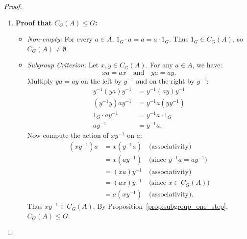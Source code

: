 \begin{proof}
\begin{enumerate}[label=\textbf{(\roman*)}, leftmargin=*, itemsep=8pt]
    \item \textbf{Proof that $C_G(A) \le G$:}
    \begin{itemize}[leftmargin=1.5em, itemsep=4pt]
        \item \emph{Non-empty:} For every $a \in A$, $1_G \cdot a = a = a \cdot 1_G$. Thus $1_G \in C_G(A)$, so $C_G(A) \ne \emptyset$.
        \item \emph{Subgroup Criterion:} Let $x, y \in C_G(A)$. For any $a \in A$, we have:
        \begin{equation*}
        xa = ax \quad \text{and} \quad ya = ay.
        \end{equation*}
        Multiply $ya = ay$ on the left by $y^{-1}$ and on the right by $y^{-1}$:
        \begin{align*}
        y^{-1}(ya)y^{-1} &= y^{-1}(ay)y^{-1} \\
        (y^{-1}y)ay^{-1} &= y^{-1}a(yy^{-1}) \\
        1_G \cdot ay^{-1} &= y^{-1}a \cdot 1_G \\
        ay^{-1} &= y^{-1}a.
        \end{align*}
        Now compute the action of $xy^{-1}$ on $a$:
        \begin{align*}
        (xy^{-1})a &= x(y^{-1}a) \quad \text{(associativity)} \\
        &= x(ay^{-1}) \quad \text{(since $y^{-1}a = ay^{-1}$)} \\
        &= (xa)y^{-1} \quad \text{(associativity)} \\
        &= (ax)y^{-1} \quad \text{(since $x \in C_G(A)$)} \\
        &= a(xy^{-1}) \quad \text{(associativity)}.
        \end{align*}
        Thus $xy^{-1} \in C_G(A)$. By Proposition~\ref{prop:subgroup_one_step}, $C_G(A) \le G$.
    \end{itemize}


\end{enumerate}
\end{proof}
